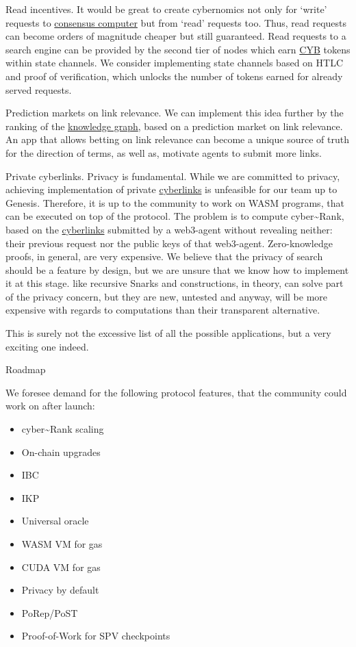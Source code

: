 \documentclass[8pt,oneside]{amsart}
\makeatletter
\newcommand{\linkgreen}[2]{\href{#1}{\color{green}{#2}}}
\renewcommand\subsection{\@startsection{subsection}
                                    {2}{\z@}
                                    {-3.25ex\@plus -1ex \@minus -.2ex}
                                    {0ex \@plus .2ex}
                                    {\play\Large}
                        }
\newcommand{\titleSection}[1]{\subsection{#1}}
\makeatother
\begin{document}
Read incentives. It would be great to create cybernomics not only for ‘write’ requests to {\hyperref[consensus-computer]{consensus computer}} but from ‘read’ requests too. Thus, read requests can become orders of magnitude cheaper but still guaranteed. Read requests to a search engine can be provided by the second tier of nodes which earn {\hyperref[cyb]{CYB}} tokens within state channels. We consider implementing state channels based on HTLC and proof of verification, which unlocks the number of tokens earned for already served requests.

Prediction markets on link relevance. We can implement this idea further by the ranking of the {\hyperref[knowledge-graph]{knowledge graph}}, based on a prediction market on link relevance. An app that allows betting on link relevance can become a unique source of truth for the direction of terms, as well as, motivate agents to submit more links.

Private cyberlinks. Privacy is fundamental. While we are committed to privacy, achieving implementation of private {\hyperref[cyberlinks]{cyberlinks}} is unfeasible for our team up to Genesis. Therefore, it is up to the community to work on WASM programs, that can be executed on top of the protocol. The problem is to compute cyber\~{}Rank, based on the {\hyperref[cyberlinks]{cyberlinks}} submitted by a web3-agent without revealing neither: their previous request nor the public keys of that web3-agent. Zero-knowledge proofs, in general, are very expensive. We believe that the privacy of search should be a feature by design, but we are unsure that we know how to implement it at this stage. \linkgreen{https://ipfs.io/ipfs/Qmdje3AmtsfjX9edWAxo3LFhV9CTAXoUvwGR7wHJXnc2Gk}{Coda} like recursive Snarks and \linkgreen{https://ipfs.io/ipfs/Qmd99xmraYip9cVv8gRMy6Y97Bkij8qUYArGDME7CzFasg}{MimbleWimble} constructions, in theory, can solve part of the privacy concern, but they are new, untested and anyway, will be more expensive with regards to computations than their transparent alternative.

This is surely not the excessive list of all the possible applications, but a very exciting one indeed.

\titleSection{Roadmap}\label{roadmap}

We foresee demand for the following protocol features, that the community could work on after launch:

\begin{itemize}
\item cyber\~{}Rank scaling
\item On-chain upgrades
\item IBC
\item IKP
\item Universal oracle
\item WASM VM for gas
\item CUDA VM for gas
\item Privacy by default
\item PoRep/PoST
\item Proof-of-Work for SPV checkpoints

\end{itemize}
\end{document}
